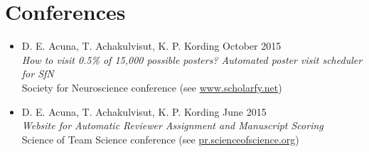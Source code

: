 \section{\sc Conferences}

\begin{itemize}[leftmargin=0cm, label={}]

\item D. E. Acuna, T. Achakulvisut, K. P. Kording \hfill October 2015\\
{\em How to visit 0.5\% of 15,000 possible posters? Automated poster visit scheduler for SfN}\\ Society for Neuroscience conference (see \href{http://www.scholarfy.net/}{www.scholarfy.net})

\item D. E. Acuna, T. Achakulvisut, K. P. Kording \hfill June 2015\\
{\em Website for Automatic Reviewer Assignment and Manuscript Scoring}\\
Science of Team Science conference (see \href{http://pr.scienceofscience.org/}{pr.scienceofscience.org})

\end{itemize}
